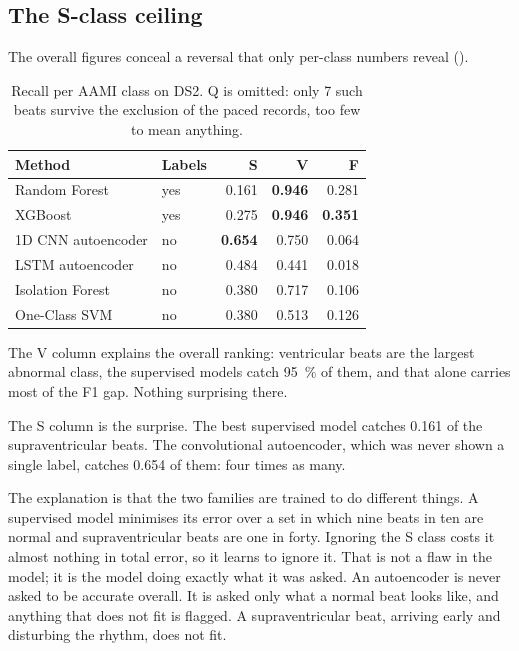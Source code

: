\documentclass[a4paper, 12pt]{article}
\begin{document}
\subsection{The S-class ceiling} \label{subsec:sclass}

The overall figures conceal a reversal that only per-class numbers reveal
().

\begin{table}[htbp]
  \centering
  \small
  \caption{Recall per AAMI class on DS2. Q is omitted: only 7 such beats survive
  the exclusion of the paced records, too few to mean anything.}
  \label{tab:perclass}
  \begin{tabular}{@{}llrrr@{}}
    \toprule
    \textbf{Method} & \textbf{Labels} & \textbf{S} & \textbf{V} & \textbf{F} \\
    \midrule
    Random Forest      & yes & 0.161 & \textbf{0.946} & 0.281 \\
    XGBoost            & yes & 0.275 & \textbf{0.946} & \textbf{0.351} \\
    1D CNN autoencoder & no  & \textbf{0.654} & 0.750 & 0.064 \\
    LSTM autoencoder   & no  & 0.484 & 0.441 & 0.018 \\
    Isolation Forest   & no  & 0.380 & 0.717 & 0.106 \\
    One-Class SVM      & no  & 0.380 & 0.513 & 0.126 \\
    \bottomrule
  \end{tabular}
\end{table}

The V column explains the overall ranking: ventricular beats are the largest
abnormal class, the supervised models catch \SI{95}{\percent} of them, and that
alone carries most of the F1 gap. Nothing surprising there.

The S column is the surprise. The best supervised model catches \num{0.161} of the
supraventricular beats. The convolutional autoencoder, which was never shown a
single label, catches \num{0.654} of them: four times as many.

The explanation is that the two families are trained to do different things. A
supervised model minimises its error over a set in which nine beats in ten are
normal and supraventricular beats are one in forty. Ignoring the S class costs it
almost nothing in total error, so it learns to ignore it. That is not a flaw in the
model; it is the model doing exactly what it was asked. An autoencoder is never
asked to be accurate overall. It is asked only what a normal beat looks like, and
anything that does not fit is flagged. A supraventricular beat, arriving early and
disturbing the rhythm, does not fit.
\end{document}

